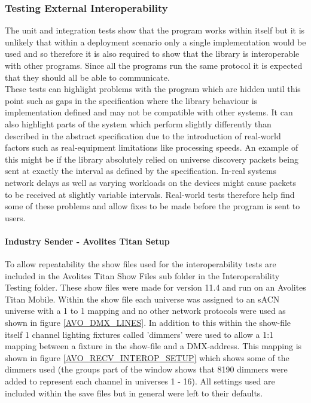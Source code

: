 \documentclass[11pt,a4paper]{article}
\begin{document}
\subsubsection{Testing External Interoperability}
The unit and integration tests show that the program works within itself but it is unlikely that within a deployment scenario only a single implementation would be used and so therefore it is also required to show that the library is interoperable with other programs. Since all the programs run the same protocol it is expected that they should all be able to communicate. \\

These tests can highlight problems with the program which are hidden until this point such as gaps in the specification where the library behaviour is implementation defined and may not be compatible with other systems. It can also highlight parts of the system which perform slightly differently than described in the abstract specification due to the introduction of real-world factors such as real-equipment limitations like processing speeds. An example of this might be if the library absolutely relied on universe discovery packets being sent at exactly the interval as defined by the specification. In-real systems network delays as well as varying workloads on the devices might cause packets to be received at slightly variable intervals. Real-world tests therefore help find some of these problems and allow fixes to be made before the program is sent to users.

\paragraph*{Industry Sender - Avolites Titan Setup}
To allow repeatability the show files used for the interoperability tests are included in the Avolites Titan Show Files sub folder in the Interoperability Testing folder. These show files were made for version 11.4 and run on an Avolites Titan Mobile. Within the show file each universe was assigned to an sACN universe with a 1 to 1 mapping and no other network protocols were used as shown in figure \ref{AVO_DMX_LINES}.  In addition to this within the show-file itself 1 channel lighting fixtures called 'dimmers' were used to allow a 1:1 mapping between a fixture in the show-file and a DMX-address. This mapping is shown in figure \ref{AVO_RECV_INTEROP_SETUP} which shows some of the dimmers used (the groups part of the window shows that 8190 dimmers were added to represent each channel in universes 1 - 16). All settings used are included within the save files but in general were left to their defaults.
\end{document}
